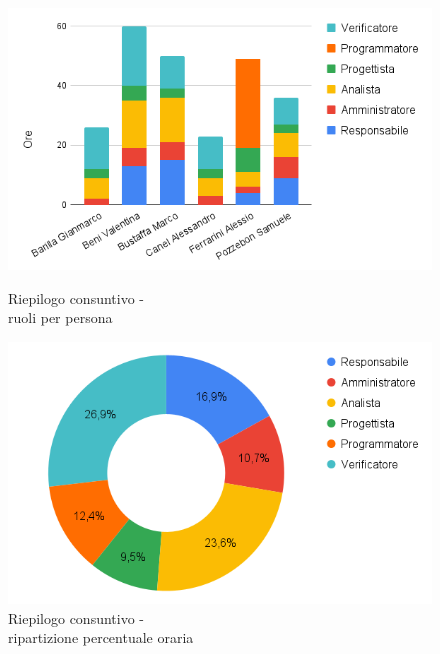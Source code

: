 \begin{figure}[h!]
	\centering
	\begin{minipage}[c]{0.42\textwidth}
    	\includegraphics[scale=0.38]{../../assets/Diagrammi_Excel/consuntivo_tot_rtb.png}
		\caption{Riepilogo consuntivo - \\ruoli per persona}
	\end{minipage}
\hfill
	\begin{minipage}[c]{0.47\textwidth}
		\includegraphics[scale=0.38]{../../assets/Diagrammi_Excel/torta_tot_rtb.png}
		\caption{Riepilogo consuntivo - \\ripartizione percentuale oraria}
	\end{minipage}
\end{figure}


